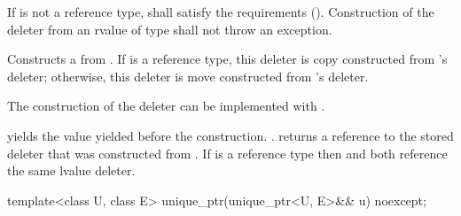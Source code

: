 \begin{itemdescr}
\pnum
\requires If  is not a reference type,
 shall satisfy the 
requirements ().
Construction
of the deleter from an rvalue of type  shall not
throw an exception.

\pnum
\effects Constructs a  from
. If  is a reference type, this
deleter is copy constructed from 's deleter; otherwise, this
deleter is move constructed from 's deleter. \begin{note} The
construction of the deleter can be implemented with . \end{note}

\pnum
\ensures {} yields the value 
yielded before the construction. .
 returns a reference
to the stored deleter that was constructed from
. If  is a reference type then
 and  both reference
the same lvalue deleter.
\end{itemdescr}

%
\begin{itemdecl}
template<class U, class E> unique_ptr(unique_ptr<U, E>&& u) noexcept;
\end{itemdecl}

